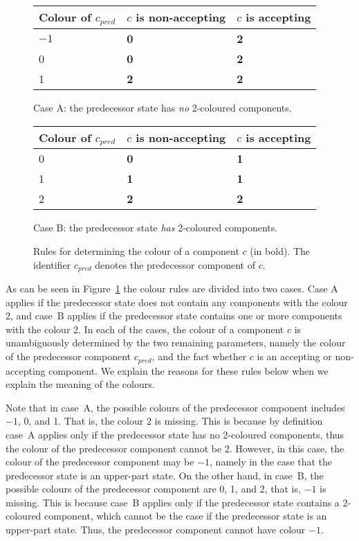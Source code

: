 \begin{figure}[htb]
\centering
  \begin{subtable}[t]{\textwidth}
  \renewcommand{\arraystretch}{1.3}
  \centering
  \begin{tabular}{|C{3cm}|C{3cm}|C{3cm}|}
    \hline
    Colour of $c_{pred}$ & $c$ is non-accepting & $c$ is accepting \\
    \hline
    $-1$ & \textbf{0} & \textbf{2} \\
    0 & \textbf{0} & \textbf{2} \\
    1 & \textbf{2} & \textbf{2} \\
    \hline
  \end{tabular}
  \caption{Case A: the predecessor state has \textit{no} 2-coloured components.}
  \end{subtable}
  \vskip0.5cm

  \begin{subtable}[t]{\textwidth}
  \renewcommand{\arraystretch}{1.3}
  \centering
  \begin{tabular}{|C{3cm}|C{3cm}|C{3cm}|}
    \hline
    Colour of $c_{pred}$ & $c$ is non-accepting & $c$ is accepting \\
     & \textbf{0} & \textbf{1} \\
    1 & \textbf{1} & \textbf{1} \\
    2 & \textbf{2} & \textbf{2} \\
    \hline
  \end{tabular}
  \caption{Case B: the predecessor state \textit{has} 2-coloured components.}
  \end{subtable}
\caption{Rules for determining the colour of a component $c$ (in bold). The identifier $c_{pred}$ denotes the predecessor component of $c$.}
\label{colour_rules}
\end{figure}

As can be seen in Figure~\ref{colour_rules} the colour rules are divided into two cases. Case A applies if the predecessor state does not contain any components with the colour 2, and case~B applies if the predecessor state contains one or more components with the colour 2. In each of the cases, the colour of a component $c$ is unambiguously determined by the two remaining parameters, namely the colour of the predecessor component $c_{pred}$, and the fact whether $c$ is an accepting or non-accepting component. We explain the reasons for these rules below when we explain the meaning of the colours.

Note that in case~A, the possible colours of the predecessor component includes $-1$, 0, and 1. That is, the colour 2 is missing. This is because by definition case~A applies only if the predecessor state has no 2-coloured components, thus the colour of the predecessor component cannot be 2. However, in this case, the colour of the predecessor component may be $-1$, namely in the case that the predecessor state is an upper-part state. On the other hand, in case~B, the possible colours of the predecessor component are 0, 1, and 2, that is, $-1$ is missing. This is because case~B applies only if the predecessor state contains a 2-coloured component, which cannot be the case if the predecessor state is an upper-part state. Thus, the predecessor component cannot have colour $-1$.

